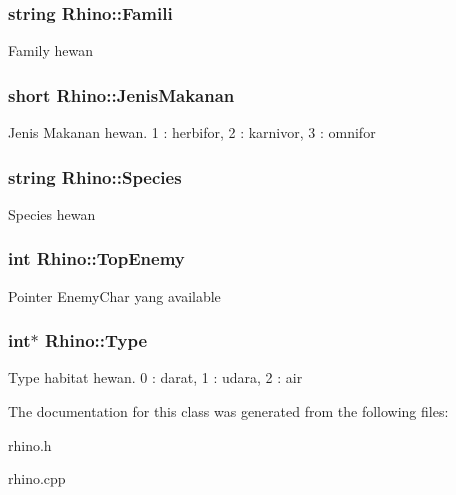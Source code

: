 \subsubsection[{\texorpdfstring{Famili}{Famili}}]{\setlength{\rightskip}{0pt plus 5cm}string Rhino\+::\+Famili\hspace{0.3cm}{\ttfamily [protected]}}\hypertarget{class_rhino_a2c816e41f908b29a368b3c76e5ad64df}{}\label{class_rhino_a2c816e41f908b29a368b3c76e5ad64df}
Family hewan 
\subsubsection[{\texorpdfstring{Jenis\+Makanan}{JenisMakanan}}]{\setlength{\rightskip}{0pt plus 5cm}short Rhino\+::\+Jenis\+Makanan\hspace{0.3cm}{\ttfamily [protected]}}\hypertarget{class_rhino_aea38cb61238b4165de624eb31e9116f4}{}\label{class_rhino_aea38cb61238b4165de624eb31e9116f4}
Jenis Makanan hewan. 1 \+: herbifor, 2 \+: karnivor, 3 \+: omnifor 
\subsubsection[{\texorpdfstring{Species}{Species}}]{\setlength{\rightskip}{0pt plus 5cm}string Rhino\+::\+Species\hspace{0.3cm}{\ttfamily [protected]}}\hypertarget{class_rhino_a8e0375e6d689c63aa136c0eaa818f0a4}{}\label{class_rhino_a8e0375e6d689c63aa136c0eaa818f0a4}
Species hewan 
\subsubsection[{\texorpdfstring{Top\+Enemy}{TopEnemy}}]{\setlength{\rightskip}{0pt plus 5cm}int Rhino\+::\+Top\+Enemy\hspace{0.3cm}{\ttfamily [protected]}}\hypertarget{class_rhino_a68e7c24e66e2fee5a812847616dac9c8}{}\label{class_rhino_a68e7c24e66e2fee5a812847616dac9c8}
Pointer Enemy\+Char yang available 
\subsubsection[{\texorpdfstring{Type}{Type}}]{\setlength{\rightskip}{0pt plus 5cm}int$\ast$ Rhino\+::\+Type\hspace{0.3cm}{\ttfamily [protected]}}\hypertarget{class_rhino_ae1ab730d941b1f359e0b85a66055fcec}{}\label{class_rhino_ae1ab730d941b1f359e0b85a66055fcec}
Type habitat hewan. 0 \+: darat, 1 \+: udara, 2 \+: air 

The documentation for this class was generated from the following files\+:\begin{DoxyCompactItemize}
\item 
rhino.\+h\item 
rhino.\+cpp\end{DoxyCompactItemize}
